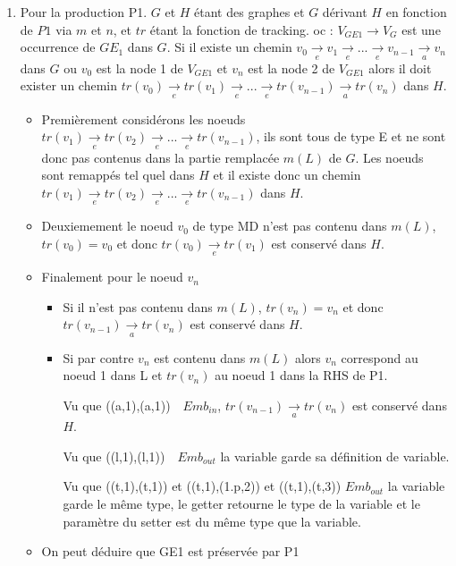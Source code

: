 \documentclass[a4paper, 12pt]{article}
\begin{document}
  \begin{enumerate}
    \item

    Pour la production P1. $G$ et $H$ étant des graphes et $G$ dérivant $H$ en fonction de $P1$ via $m$ et $n$, et $tr$ étant la fonction de tracking. oc :  \( {V_{GE1}} {\rightarrow} {V_G} \) est une occurrence de  {$GE_1$} dans $G$.
    Si il existe un chemin \( v_0 \underset{e}{\rightarrow} v_1 \underset{e}{\rightarrow} ... \underset{e}{\rightarrow} v_{n-1} \underset{a}{\rightarrow} v_n \) dans $G$
    ou {$v_0$} est la node 1 de {$V_{GE1}$} et {$v_n$} est la node 2 de $V_{GE1}$
    alors il doit exister un chemin \( tr(v_0) \underset{e}{\rightarrow} tr(v_1) \underset{e}{\rightarrow} ... \underset{e}{\rightarrow} tr(v_{n-1}) \underset{a}{\rightarrow} tr({v_n}) \) dans $H$.
    \begin{itemize}[label=\textbullet]
      \item Premièrement considérons les noeuds $tr(v_1) \underset{e}{\rightarrow} tr(v_2) \underset{e}{\rightarrow} ... \underset{e}{\rightarrow} tr(v_{n-1})$,
      ils sont tous de type E et ne sont donc pas contenus dans la partie remplacée $m(L)$ de $G$.
      Les noeuds sont remappés tel quel dans $H$ et il existe donc un chemin $tr(v_1) \underset{e}{\rightarrow} tr(v_2) \underset{e}{\rightarrow} ... \underset{e}{\rightarrow} tr(v_{n-1})$ dans $H$.

      \item Deuxiemement le noeud $v_0$ de type MD n'est pas contenu dans $m(L)$, $tr(v_0) = v_0$ et donc $tr(v_0) \underset{e}{\rightarrow} tr(v_1)$ est conservé dans $H$.

      \item Finalement pour le noeud {$v_n$}
      \begin{itemize}
      \item Si il n'est pas contenu dans $m(L)$, $tr(v_n)= v_n$ et donc $tr(v_{n-1}) \underset{a}{\rightarrow} tr(v_n)$ est conservé dans $H$.
      \item Si par contre $v_n$ est contenu dans $m(L)$ alors $v_n$ correspond au noeud 1 dans L et $tr(v_n)$ au noeud 1 dans la RHS de P1.

      Vu que ((a,1),(a,1))~\in~$Emb_{in}$, $tr(v_{n-1}) \underset{a}{\rightarrow} tr(v_n)$ est conservé dans $H$.

      Vu que ((l,1),(l,1))~\in~$Emb_{out}$ la variable garde sa définition de variable.

      Vu que ((t,1),(t,1)) et ((t,1),(1.p,2)) et ((t,1),(t,3)) \in $Emb_{out}$ la variable garde le même type, le getter retourne le type de la variable et le paramètre du setter est
      du même type que la variable.
    \end{itemize}
    \item On peut déduire que GE1 est préservée par P1
    \end{itemize}


\end{enumerate}
\end{document}
